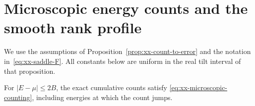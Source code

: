 \section{Microscopic energy counts and the smooth rank profile}
\label{app:xx-full}

We use the assumptions of Proposition~\ref{prop:xx-count-to-error} and
the notation in~\eqref{eq:xx-saddle-F}. All constants below are uniform
in the real tilt interval of that proposition.

\begin{lemma}
\label{lem:xx-microscopic-counting}
For $|E-\mu|\le2B$, the exact cumulative counts satisfy
\eqref{eq:xx-microscopic-counting}, including energies at which the count
jumps.
\end{lemma}

